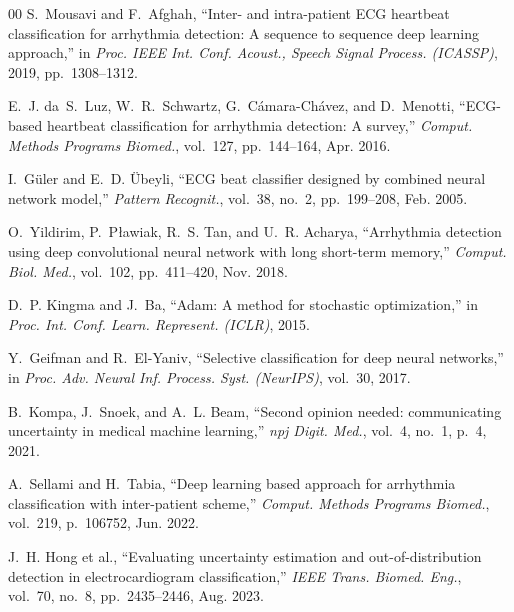 \documentclass[conference]{IEEEtran}
\begin{document}
\begin{thebibliography}{00}
S.~Mousavi and F.~Afghah, ``Inter- and intra-patient ECG heartbeat classification for arrhythmia detection: A sequence to sequence deep learning approach,'' in \textit{Proc. IEEE Int. Conf. Acoust., Speech Signal Process. (ICASSP)}, 2019, pp.~1308--1312.

E.~J. da~S.~Luz, W.~R.~Schwartz, G.~C\'{a}mara-Ch\'{a}vez, and D.~Menotti, ``ECG-based heartbeat classification for arrhythmia detection: A survey,'' \textit{Comput. Methods Programs Biomed.}, vol.~127, pp.~144--164, Apr. 2016.

I.~G\"{u}ler and E.~D. \"{U}beyli, ``ECG beat classifier designed by combined neural network model,'' \textit{Pattern Recognit.}, vol.~38, no.~2, pp.~199--208, Feb. 2005.

O.~Yildirim, P.~P{\l}awiak, R.~S. Tan, and U.~R. Acharya, ``Arrhythmia detection using deep convolutional neural network with long short-term memory,'' \textit{Comput. Biol. Med.}, vol.~102, pp.~411--420, Nov. 2018.

D.~P. Kingma and J.~Ba, ``Adam: A method for stochastic optimization,'' in \textit{Proc. Int. Conf. Learn. Represent. (ICLR)}, 2015.

Y.~Geifman and R.~El-Yaniv, ``Selective classification for deep neural networks,'' in \textit{Proc. Adv. Neural Inf. Process. Syst. (NeurIPS)}, vol.~30, 2017.

B.~Kompa, J.~Snoek, and A.~L. Beam, ``Second opinion needed: communicating uncertainty in medical machine learning,'' \textit{npj Digit. Med.}, vol.~4, no.~1, p.~4, 2021.

A.~Sellami and H.~Tabia, ``Deep learning based approach for arrhythmia classification with inter-patient scheme,'' \textit{Comput. Methods Programs Biomed.}, vol.~219, p.~106752, Jun. 2022.

J.~H. Hong et al., ``Evaluating uncertainty estimation and out-of-distribution detection in electrocardiogram classification,'' \textit{IEEE Trans. Biomed. Eng.}, vol.~70, no.~8, pp.~2435--2446, Aug. 2023.

\end{thebibliography}
\end{document}
